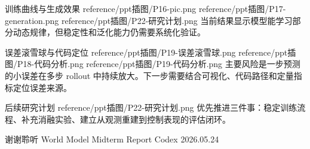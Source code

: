 \documentclass[aspectratio=169]{beamer}
\newcommand{\wmasset}[1]{reference/ppt插图/#1}
\begin{document}
\WinterThreeImageResultFrame
  {训练曲线与生成效果}
  {\wmasset{P16-pic.png}}
  {\wmasset{P17-generation.png}}
  {\wmasset{P22-研究计划.png}}
  {当前结果显示模型能学习部分动态规律，但稳定性和泛化能力仍需要系统化验证。}


\WinterCodeAnalysisFrame
  {误差滚雪球与代码定位}
  {\wmasset{P19-误差滚雪球.png}}
  {\wmasset{P18-代码分析.png}}
  {\wmasset{P19-代码分析.png}}
  {主要风险是一步预测的小误差在多步 rollout 中持续放大。下一步需要结合可视化、代码路径和定量指标定位误差来源。}

\WinterPlanFrame
  {后续研究计划}
  {\wmasset{P22-研究计划.png}}
  {优先推进三件事：稳定训练流程、补充消融实验、建立从观测重建到控制表现的评估闭环。}

\WinterThanks
  {谢谢聆听}
  {World Model Midterm Report}
  {Codex}
  {2026.05.24}
\end{document}
